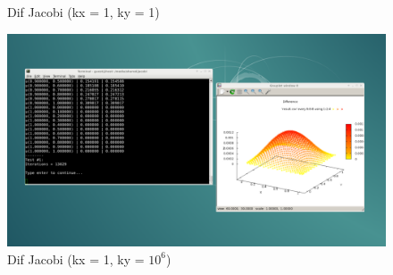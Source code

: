 \documentclass[a4paper, fleqn]{report}
\begin{document}
\begin{figure}[h]
\begin{minipage}{0.49\textwidth}
        \caption{Dif Jacobi (kx = 1, ky = 1)}
    \end{minipage}%
    \begin{minipage}{0.49\textwidth}
        \centering
        \includegraphics[width=\textwidth]{media/dif_jacobi_1_1000000.png}
        \caption{Dif Jacobi (kx = 1, ky = $10^6$)}
    \end{minipage}
    \par\bigskip
\end{figure}
\end{document}
